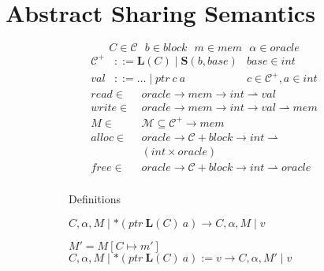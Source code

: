 \documentclass{article}
\begin{document}



\section{Abstract Sharing Semantics}

\begin{figure}
  \begin{subfigure}{0.4\textwidth}
    \[C \in \mathcal{C}~~~ b \in \mathit{block}~~~  m \in \mathit{mem}~~~ \alpha \in \mathit{oracle}\]
    \[\begin{aligned}
    \mathcal{C}^+ & ::= \mathbf{L}(C) \mid \mathbf{S}(b, \mathit{base}) &
    \mathit{base} \in \mathit{int} \\
    \mathit{val} & ::= \ldots \mid \mathit{ptr} ~ c ~ a &
    c \in \mathcal{C}^+, a \in \mathit{int}
    \end{aligned}\]
    \[\begin{split}
    \mathit{read} \in ~ & \mathit{oracle} \rightarrow \mathit{mem} \rightarrow
    \mathit{int} \rightharpoonup \mathit{val} \\
    \mathit{write} \in ~ & \mathit{oracle} \rightarrow \mathit{mem} \rightarrow
    \mathit{int} \rightarrow \mathit{val} \rightharpoonup \mathit{mem} \\
    M \in ~ & \mathcal{M} \subseteq \mathcal{C}^+ \rightarrow \mathit{mem} \\
    \mathit{alloc} \in ~ & \mathit{oracle} \rightarrow
    \mathcal{C} + \mathit{block} \rightarrow \mathit{int} \rightharpoonup \\
    & (\mathit{int} \times \mathit{oracle}) \\
    \mathit{free} \in ~ & \mathit{oracle} \rightarrow \mathcal{C}+\mathit{block} \rightarrow
    \mathit{int} \rightharpoonup \mathit{oracle} \\
    \end{split}\]

    \caption{Definitions}
    \label{subfig:defs}
  \end{subfigure}
  \begin{subfigure}{0.55\textwidth}
             {\(C, \alpha, M \mid *(\mathit{ptr} ~ \mathbf{L}(C) ~ a)
               \longrightarrow C, \alpha, M \mid v\)}

                {\(M' = M[C \mapsto m']\)}
                {\(C, \alpha, M \mid *(\mathit{ptr} ~ \mathbf{L}(C) ~ a) := v
                  \longrightarrow C, \alpha, M' \mid v\)}


\end{subfigure}
\end{figure}
\end{document}
